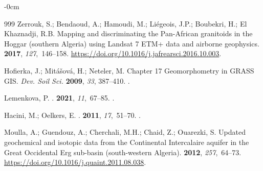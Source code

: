 \documentclass[asi,article,accept,pdftex,moreauthors]{Definitions/mdpi}
\begin{document}
\begin{adjustwidth}{-\extralength}{0cm}
\begin{thebibliography}{999}
Zerrouk, S.; Bendaoud, A.; Hamoudi, M.; Liégeois, J.P.; Boubekri, H.; {El
  Khaznadji}, R.B.
\newblock Mapping and discriminating the Pan-African granitoids in the Hoggar
  (southern Algeria) using Landsat 7 ETM+ data and airborne geophysics.
 {\bf 2017}, {\em
  127},~146--158. %
  {\url{https://doi.org/10.1016/j.jafrearsci.2016.10.003}}.

Hofierka, J.; Mitášová, H.; Neteler, M.
\newblock Chapter 17 Geomorphometry in GRASS GIS. {\em Dev. Soil Sci. %
}
\textbf{2009}, \emph{33}, 387--410.
.

Lemenkova, P.
.
 {\bf 2021}, {\em 11},~67--85.
.

Hacini, M.; Oelkers, E.
.
 {\bf 2011}, {\em 17},~51--70.
.


Moulla, A.; Guendouz, A.; Cherchali, M.H.; Chaid, Z.; Ouarezki, S.
\newblock Updated geochemical and isotopic data from the Continental
  Intercalaire aquifer in the Great Occidental Erg sub-basin (south-western
  Algeria).
 {\bf 2012}, {\em 257},~64--73. %
  {\url{https://doi.org/10.1016/j.quaint.2011.08.038}}.


\end{thebibliography}
\end{adjustwidth}
\end{document}
